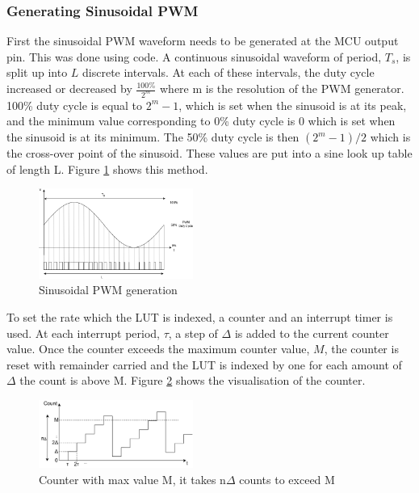 \subsubsection{Generating Sinusoidal PWM}
\label{sec:L_Sinusoidal PWM}
First the sinusoidal PWM waveform needs to be generated at the MCU output pin. This was done using code. A continuous sinusoidal waveform of period, $T_s$, is split up into $L$ discrete intervals. At each of these intervals, the duty cycle increased or decreased by $\frac{100\%}{2^m}$ where m is the resolution of the PWM generator. 100\% duty cycle is equal to $2^m - 1$, which is set when the sinusoid is at its peak, and the minimum value corresponding to 0\% duty cycle is 0 which is set when the sinusoid is at its minimum. The 50\% duty cycle is then $(2^m-1)/2$ which is the cross-over point of the sinusoid. These values are put into a sine look up table of length L. Figure \ref{fig:L_Sinusoidal_PWM} shows this method. \\

\begin{figure} [!htb]
	\hfill\includegraphics[width=0.45\textwidth]{./images/speaker/L_Sinusoidal_PWM}\hspace{\fill}
	\caption{Sinusoidal PWM generation}
	\label{fig:L_Sinusoidal_PWM}
\end{figure}
To set the rate which the LUT is indexed, a counter and an interrupt timer is used. At each interrupt period, $\tau$, a step of $\Delta$ is added to the current counter value. Once the counter exceeds the maximum counter value, $M$, the counter is reset with remainder carried and the LUT is indexed by one for each amount of $\Delta$ the count is above M. Figure \ref{fig:L_Counter} shows the visualisation of the counter. 
\begin{figure} [!htb]
	\captionsetup{justification=centering}
	\hfill\includegraphics[width=0.45\textwidth]{./images/speaker/L_Counter}\hspace{\fill}
	\caption{Counter with max value M, it takes n$\Delta$ counts to exceed M}
	\label{fig:L_Counter}
\end{figure}

